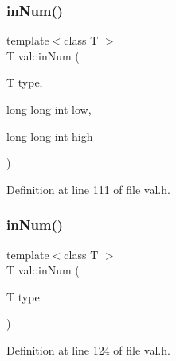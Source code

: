 \subsubsection{\texorpdfstring{in\+Num()}{inNum()}\hspace{0.1cm}{\footnotesize\ttfamily [1/2]}}
{\footnotesize\ttfamily template$<$class T $>$ \\
T val\+::in\+Num (\begin{DoxyParamCaption}\item[{T}]{type,  }\item[{long long int}]{low,  }\item[{long long int}]{high }\end{DoxyParamCaption})}



Definition at line 111 of file val.\+h.

\mbox{\label{namespaceval_a60111e656b9a6cf50799589c32b7cf55}} 
\subsubsection{\texorpdfstring{in\+Num()}{inNum()}\hspace{0.1cm}{\footnotesize\ttfamily [2/2]}}
{\footnotesize\ttfamily template$<$class T $>$ \\
T val\+::in\+Num (\begin{DoxyParamCaption}\item[{T}]{type }\end{DoxyParamCaption})}



Definition at line 124 of file val.\+h.

